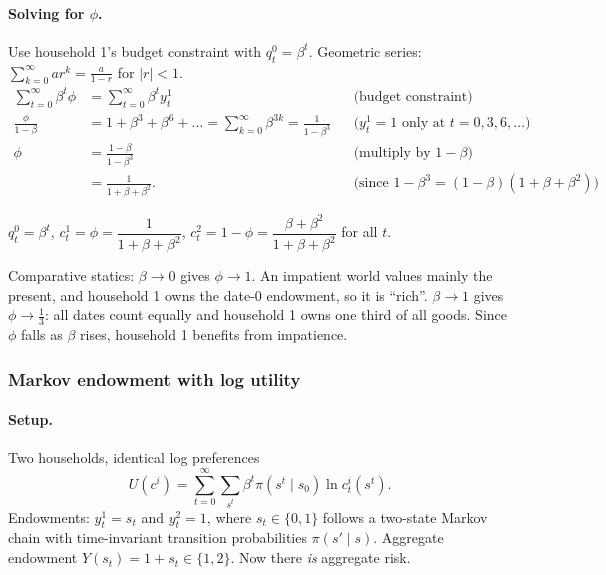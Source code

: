 \paragraph{Solving for $\phi$.} Use household 1's budget constraint with $q^0_t=\beta^t$. Geometric series: $\sum_{k=0}^\infty ar^k=\frac{a}{1-r}$ for $|r|<1$.
\begin{align*}
  \sum_{t=0}^\infty \beta^t\phi &= \sum_{t=0}^\infty\beta^t y^1_t && \text{(budget constraint)}\\
  \frac{\phi}{1-\beta} &= 1+\beta^3+\beta^6+\dots = \sum_{k=0}^\infty\beta^{3k} = \frac{1}{1-\beta^3} && \text{($y^1_t=1$ only at $t=0,3,6,\dots$)}\\
  \phi &= \frac{1-\beta}{1-\beta^3} && \text{(multiply by $1-\beta$)}\\
  &= \frac{1}{1+\beta+\beta^2}. && \text{(since $1-\beta^3=(1-\beta)(1+\beta+\beta^2)$)}
\end{align*}
\begin{keybox}[title=HW3 Q3 answer]
$q^0_t=\beta^t$, \quad $c^1_t=\phi=\dfrac{1}{1+\beta+\beta^2}$, \quad $c^2_t=1-\phi=\dfrac{\beta+\beta^2}{1+\beta+\beta^2}$ for all $t$.
\end{keybox}
Comparative statics: $\beta\to0$ gives $\phi\to1$. An impatient world values mainly the present, and household 1 owns the date-0 endowment, so it is ``rich''. $\beta\to1$ gives $\phi\to\tfrac13$: all dates count equally and household 1 owns one third of all goods. Since $\phi$ falls as $\beta$ rises, household 1 benefits from impatience.

\subsubsection{Markov endowment with log utility}
\paragraph{Setup.} Two households, identical log preferences
\[
U(c^i)=\sum_{t=0}^\infty\sum_{s^t}\beta^t\pi(s^t\mid s_0)\ln c^i_t(s^t).
\]
Endowments: $y^1_t=s_t$ and $y^2_t=1$, where $s_t\in\{0,1\}$ follows a two-state Markov chain with time-invariant transition probabilities $\pi(s'\mid s)$. Aggregate endowment $Y(s_t)=1+s_t\in\{1,2\}$. Now there \emph{is} aggregate risk.

